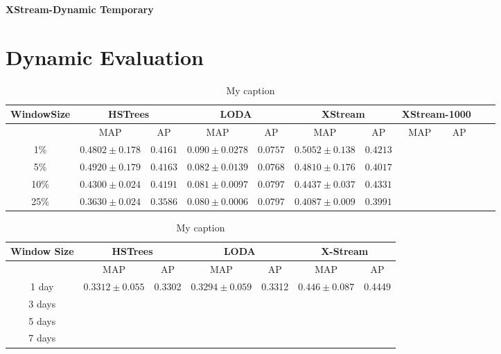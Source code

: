 \documentclass[11pt,onecolumn]{article}
\begin{document}
\textbf{\huge{XStream-Dynamic Temporary}}

\section{Dynamic Evaluation}

\begin{table}[!hbtp]
    \centering
    \begin{tabular}{|c|c|c|c|c|c|c|c|c|c|c|}
            \toprule
    \textbf{WindowSize} & \multicolumn{2}{|c|}{\textbf{HSTrees}} & \multicolumn{2}{|c|}{\textbf{LODA}} & \multicolumn{2}{|c|}{\textbf{XStream}} & \multicolumn{2}{|c|}{\textbf{XStream-1000}} \\	\hline
                & MAP               & AP      & MAP              & AP     & MAP               & AP       & MAP & AP	\\
                \midrule \midrule
    1\%  & $0.4802 \pm 0.178$ & $0.4161$ & $0.090 \pm 0.0278$ & $0.0757$ & $0.5052 \pm 0.138$ & $0.4213$ 	& & \\	\hline
    5\% & $0.4920 \pm 0.179$ & $0.4163$ & $0.082 \pm 0.0139$ & $0.0768$ & $0.4810 \pm 0.176$ & $0.4017$ & &	\\	\hline
    10\% & $0.4300 \pm 0.024$ & $0.4191$ & $0.081 \pm 0.0097$ & $0.0797$ & $0.4437 \pm 0.037$ & $0.4331$ & &	\\	\hline
    25\% & $0.3630 \pm 0.024$ & $0.3586$ & $0.080 \pm 0.0006$ & $0.0797$ & $0.4087 \pm 0.009$ & $0.3991$	\\	\hline
    \bottomrule
    \end{tabular}
    \caption{My caption}
\label{my-label}
\end{table}

\begin{table}[]
\centering
\begin{tabular}{|c|c|c|c|c|c|c|}
\toprule
\textbf{Window Size} & \multicolumn{2}{|c|}{\textbf{HSTrees}} & \multicolumn{2}{|c|}{\textbf{LODA}}  & \multicolumn{2}{|c|}{\textbf{X-Stream}} \\ \hline\midrule
            & MAP               & AP      & MAP              & AP     & MAP               & AP       \\
            \midrule\midrule
1 day       & $0.3312 \pm 0.055$  & 0.3302  & $0.3294 \pm 0.059$ & 0.3312 & $0.446 \pm 0.087$   & 0.4449   \\	\hline
3 days      &                   &         &                  &        &                   &          \\
5 days      &                   &         &                  &        &                   &          \\
7 days      &                   &         &                  &        &                   &          \\ \bottomrule
\end{tabular}
\caption{My caption}
\label{my-label}
\end{table}



\printbibliography
\end{document}
